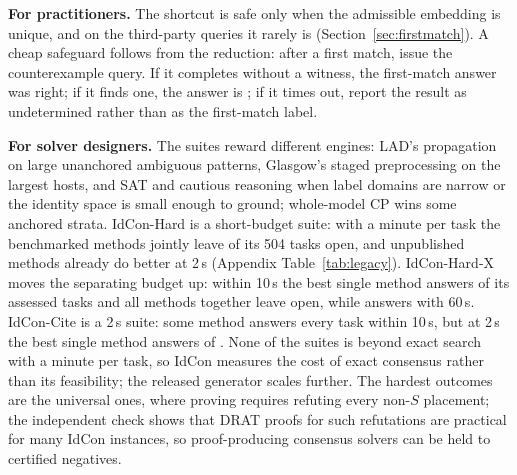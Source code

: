 \textbf{For practitioners.} The shortcut is safe only when the admissible embedding is unique, and on the third-party queries it rarely is (Section~\ref{sec:firstmatch}). A cheap safeguard follows from the reduction: after a first match, issue the counterexample query. If it completes without a witness, the first-match answer was right; if it finds one, the answer is \Unk{}; if it times out, report the result as undetermined rather than as the first-match label.

\textbf{For solver designers.} The suites reward different engines: LAD's propagation on large unanchored ambiguous patterns, Glasgow's staged preprocessing on the largest hosts, and SAT and cautious reasoning when label domains are narrow or the identity space is small enough to ground; whole-model CP wins some anchored strata. IdCon-Hard is a short-budget suite: with a minute per task the benchmarked methods jointly leave \hardVBSAllUnsolvedSixty{} of its 504 tasks open, and unpublished methods already do better at 2\,s (Appendix Table~\ref{tab:legacy}). IdCon-Hard-X moves the separating budget up: within 10\,s the best single method answers \hardxBestSingleTenN{} of its \hardxComplete{} assessed tasks and all methods together leave \hardxVBSUnsolvedTen{} open, while \hardxBestSingleSixty{} answers \hardxBestSingleSixtyN{} with 60\,s. IdCon-Cite is a 2\,s suite: some method answers every task within 10\,s, but at 2\,s the best single method answers \citeBestSingleTwoN{} of \citeTasks{}. None of the suites is beyond exact search with a minute per task, so IdCon measures the cost of exact consensus rather than its feasibility; the released generator scales further. The hardest outcomes are the universal ones, where proving \Sat{} requires refuting every non-$S$ placement; the independent check shows that DRAT proofs for such refutations are practical for many IdCon instances, so proof-producing consensus solvers \cite{auditablecp} can be held to certified negatives.
